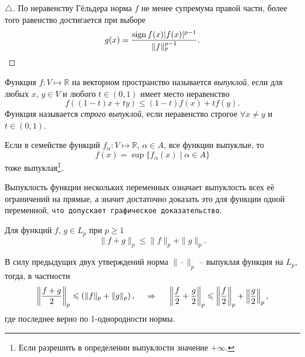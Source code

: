 \begin{proof}[$\triangle$]
По неравенству Гёльдера норма $f$ не менее супремума правой части, более того равенство достигается при выборе
\begin{equation*}
    g(x) = \frac{\sign f(x) |f(x)|^{p-1}}{\|f\|_p^{p-1}}.
\end{equation*}
\end{proof}

\begin{to_def}
    Функция $f \colon V \mapsto \mathbb{R}$ на векторном пространство называется \textit{выпуклой}, если для любых $x, \, y \in V$ и любого $t \in (0, 1)$ имеет место неравенство
    \begin{equation*}
        f ( (1-t) x + ty) \leq (1-t) f(x) + t f(y).
    \end{equation*}
    Функция называется \textit{строго выпуклой}, если неравенство строгое $\forall x \neq y$ и $t \in (0, 1)$. 
\end{to_def}

\begin{to_lem}
    Если в семействе функций $f_\alpha \colon V \mapsto \mathbb{R}$, $\alpha \in A$, все функции выпуклые, то
    \begin{equation*}
        f(x) = \sup \{f_\alpha (x) \mid \alpha \in A\}
    \end{equation*}
    тоже выпуклая\footnote{
        Если разрешить в определении выпуклости значение $+ \infty$.
    }.
\end{to_lem}

\begin{uproof}
    Выпуклость функции нескольких переменных означает выпуклость всех её ограничений на прямые, а значит достаточно доказать это для функции одной переменной, \texttt{что допускает графическое доказательство}. 
\end{uproof}

\begin{to_thr}
    Для функций $f, \, g \in L_p$ при $p \geq 1$
    \begin{equation*}
        \|f + g\|_p \leq \|f\|_p + \|g\|_p.
    \end{equation*}
\end{to_thr}

\begin{uproof}
    В силу предыдущих двух утверждений норма $\|\cdot\|_p$ -- выпуклая функция на $L_p$, тогда, в частности
    \begin{equation*}
        \left\|\frac{f+g}{2}\right\|_p \leq \left(
            \|f\|_p + \|g\|_p
        \right),
        \hspace{0.5cm} \Rightarrow \hspace{0.5cm}  
        \left\|\frac{f}{2} + \frac{g}{2}\right\|_p \leq \left\|\frac{f}{2}\right\|_p + \left\|\frac{g}{2}\right\|_p,
    \end{equation*}
    где последнее верно по 1-однородности нормы. 
\end{uproof}

